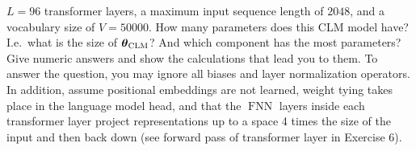 \documentclass[11pt,a4paper]{article}
\newcommand\op[1]{\operatorname{#1}}
\begin{document}
\begin{enumerate}[label=(\alph*)]
          $L = 96$ transformer layers, a maximum input sequence length of
          $2048$, and a vocabulary size of $V = 50000$.
          How many parameters does this CLM model have?
          I.e.\ what is the size of $\vtheta_{\op{CLM}}$?
          And which component has the most parameters?
          Give numeric answers and show the calculations that lead you to them.
          To answer the question, you may ignore all biases and layer
          normalization operators.
          In addition, assume positional embeddings are not learned, weight
          tying takes place in the language model head, and that the $\op{FNN}$
          layers inside each transformer layer project representations up to a
          space 4 times the size of the input and then back down (see forward
          pass of transformer layer in Exercise 6).
\end{enumerate}
\end{document}
